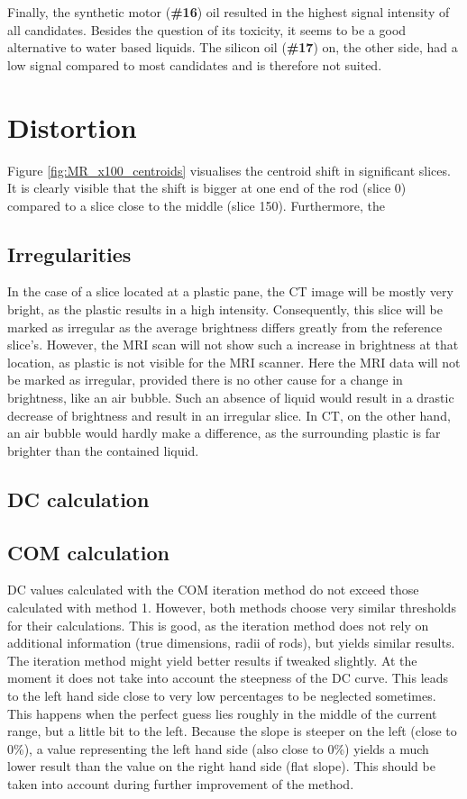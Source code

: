 Finally, the synthetic motor (\textbf{\#16}) oil resulted in the highest signal intensity of all candidates.
Besides the question of its toxicity, it seems to be a good alternative to water based liquids.
The silicon oil (\textbf{\#17}) on, the other side, had a low signal compared to most candidates and is therefore not suited.


\section{Distortion}


Figure \ref{fig:MR_x100_centroids} visualises the centroid shift in significant slices.
It is clearly visible that the shift is bigger at one end of the rod (slice 0) compared to a slice close to the middle (slice 150).
Furthermore, the 

\subsection{Irregularities}
In the case of a slice located at a plastic pane, the CT image will be mostly very bright, as the plastic results in a high intensity.
Consequently, this slice will be marked as irregular as the average brightness differs greatly from the reference slice's.
However, the MRI scan will not show such a increase in brightness at that location, as plastic is not visible for the MRI scanner.
Here the MRI data will not be marked as irregular, provided there is no other cause for a change in brightness, like an air bubble.
Such an absence of liquid would result in a drastic decrease of brightness and result in an irregular slice.
In CT, on the other hand, an air bubble would hardly make a difference, as the surrounding plastic is far brighter than the contained liquid.

\subsection{DC calculation}
\label{sec:discussion_DC}

\subsection{COM calculation}
DC values calculated with the COM iteration method do not exceed those calculated with method 1.
However, both methods choose very similar thresholds for their calculations.
This is good, as the iteration method does not rely on additional information (true dimensions, radii of rods), but yields similar results.
The iteration method might yield better results if tweaked slightly.
At the moment it does not take into account the steepness of the DC curve.
This leads to the left hand side close to very low percentages to be neglected sometimes.
This happens when the perfect guess lies roughly in the middle of the current range, but a little bit to the left.
Because the slope is steeper on the left (close to 0\%), a value representing the left hand side (also close to 0\%) yields a much lower result than the value on the right hand side (flat slope).
This should be taken into account during further improvement of the method.


